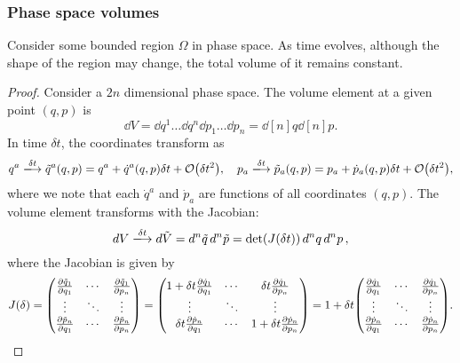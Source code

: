 \documentclass{article}
\begin{document}
\subsubsection{Phase space volumes}
\begin{theorem}[Liouville 1]
	Consider some bounded region $ \Omega $ in phase space. As time evolves, although the shape of the region may change, the total volume of it remains constant.
\end{theorem}
\begin{proof}
	Consider a $ 2n $ dimensional phase space. The volume element at a given point $ (q,p) $ is
	\begin{equation}
		\dd{V} = \dd{q}^{1} \dots \dd{q}^{n} \dd{p}_{1} \dots \dd{p}_{n} = \dd[n]{q} \dd[n]{p}.
	\end{equation}
	In time $ \delta t $, the coordinates transform as
	\begin{equation}
		q^{a} \xlongrightarrow{\delta t} \tilde{q}^{a}(q,p) = q^{a} + \dot{q}^a(q,p) \delta t + \order{\delta t^{2}}, \quad p_{a} \xlongrightarrow{\delta t} \tilde{p}_{a}(q,p) = p_{a} + \dot{p}_{a}(q,p) \delta t + \order{\delta t^{2}},
	\end{equation}
	where we note that each $ \dot{q}^a $ and $ \dot{p}_{a} $ are functions of all coordinates $ (q,p) $. The volume element transforms with the Jacobian:
	\begin{equation}
		\dd{V} \xlongrightarrow{\delta t} \dd{\tilde{V}} = \dd[n]{\tilde{q} } \dd[n]{\tilde{p}} = \det(J(\delta t)) \dd[n]{q} \dd[n]{p},
	\end{equation}
	where the Jacobian is given by
	\begin{equation} \label{jacobianliouville}
		J(\delta) = \mqty( \pdv{\tilde{q}_{1}}{q_{1}} & \cdots & \pdv{\tilde{q}_{1}}{p_{n}} \\
								\vdots & \ddots & \vdots \\
								\pdv{\tilde{p}_{n}}{q_{1}} & \cdots & \pdv{\tilde{p}_{n}}{p_{n}}) 
								= \mqty(1 + \delta t \pdv{\dot{q}_{1}}{q_{1}} & \cdots & \delta t \pdv{\dot{q}_{1}}{p_{n}} \\
								\vdots & \ddots & \vdots \\
								\delta t \pdv{\dot{p}_{n}}{q_{1}} & \cdots & 1 + \delta t \pdv{\dot{p}_{n}}{p_{n}} ) = 1 + \delta t \mqty(\pdv{\dot{q}_{1}}{q_{1}} & \cdots & \pdv{\dot{q}_{1}}{p_{n}} \\
								\vdots & \ddots & \vdots \\
								\pdv{\dot{p}_{n}}{q_{1}} & \cdots & \pdv{\dot{p}_{n}}{p_{n}} ).

\end{equation}
\end{proof}
\end{document}
